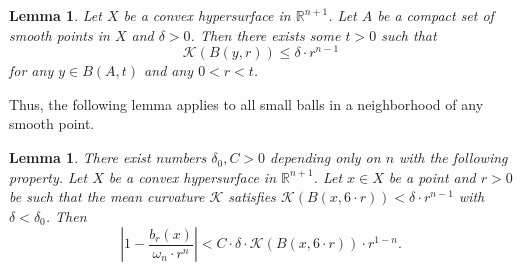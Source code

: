 \documentclass[12pt,leqno,intlimits]{amsart}
\numberwithin{equation}{section}
\newtheorem{lem}[thm]{Lemma}
\theoremstyle{definition}
\theoremstyle{remark}
\newcommand{\R}{\mathbb{R}}
\begin{document}
\begin{lem} \label{lem:compsm}
Let $X$ be a convex hypersurface in $\R^{n+1}$. Let $A$ be a compact set of smooth points in $X$ and  $\delta >0$.
Then there exists some $t>0$ such that
\[\mathcal K(B(y,r)) \leq \delta \cdot r^{n-1}\]
for any $y\in B (A,{t})$ and any $0<r<t$.
\end{lem}
Thus, the following lemma applies to all small balls in a neighborhood of any smooth point.


\begin{lem} \label{lem:mean}
There exist numbers $\delta_0,C>0$ depending only on $n$ with the following property. Let $X$ be a convex hypersurface in $\R^{n+1}$.
Let $x\in X$ be a point and $r>0$ be such that the mean curvature $\mathcal K$ satisfies $\mathcal K(B (x,{6{\cdot}r})) < \delta \cdot r^{n-1}$ with $\delta <\delta _0$.
Then
\begin{equation} \label{eq:lemma}
\left| 1 - \frac {b_r (x)} { \omega _n{\cdot}r^n}\right|
<
C\cdot \delta \cdot \mathcal K( B (x,{6{\cdot}r})) \cdot r^{1-n}.
\end{equation}
\end{lem}
\end{document}
